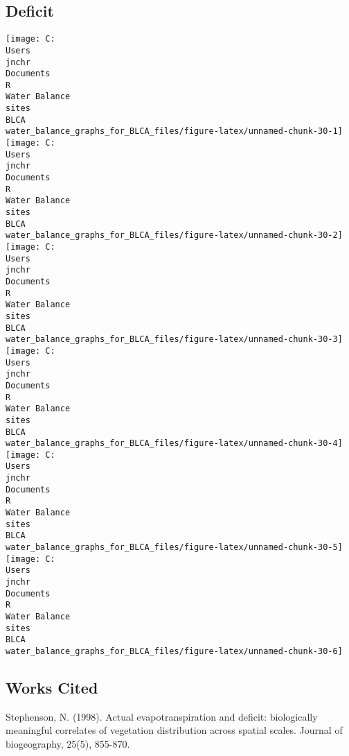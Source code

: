 \documentclass[
]{article}
\begin{document}
\hypertarget{deficit}{%
\subsection{Deficit}\label{deficit}}

\texttt{[image: C:\\Users\\jnchr\\Documents\\R\\Water Balance\\sites\\BLCA\\water\_balance\_graphs\_for\_BLCA\_files/figure-latex/unnamed-chunk-30-1]}
\texttt{[image: C:\\Users\\jnchr\\Documents\\R\\Water Balance\\sites\\BLCA\\water\_balance\_graphs\_for\_BLCA\_files/figure-latex/unnamed-chunk-30-2]}
\texttt{[image: C:\\Users\\jnchr\\Documents\\R\\Water Balance\\sites\\BLCA\\water\_balance\_graphs\_for\_BLCA\_files/figure-latex/unnamed-chunk-30-3]}
\texttt{[image: C:\\Users\\jnchr\\Documents\\R\\Water Balance\\sites\\BLCA\\water\_balance\_graphs\_for\_BLCA\_files/figure-latex/unnamed-chunk-30-4]}
\texttt{[image: C:\\Users\\jnchr\\Documents\\R\\Water Balance\\sites\\BLCA\\water\_balance\_graphs\_for\_BLCA\_files/figure-latex/unnamed-chunk-30-5]}
\texttt{[image: C:\\Users\\jnchr\\Documents\\R\\Water Balance\\sites\\BLCA\\water\_balance\_graphs\_for\_BLCA\_files/figure-latex/unnamed-chunk-30-6]}

\hypertarget{works-cited}{%
\subsection{Works Cited}\label{works-cited}}

Stephenson, N. (1998). Actual evapotranspiration and deficit:
biologically meaningful correlates of vegetation distribution across
spatial scales. Journal of biogeography, 25(5), 855-870.
\end{document}
